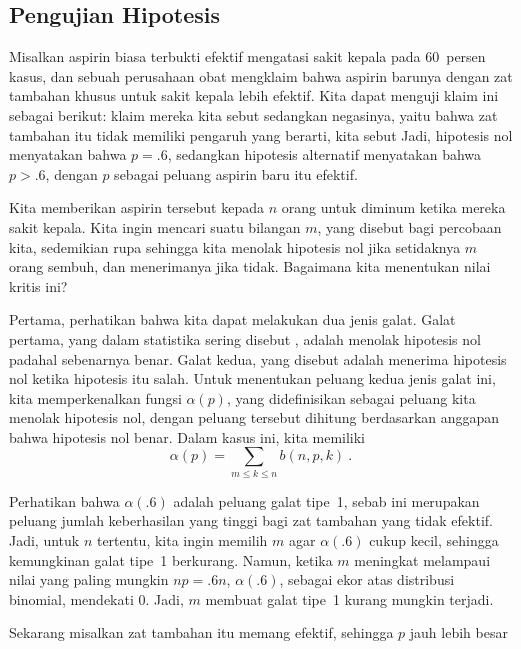 \subsection*{Pengujian Hipotesis}

\begin{example}\label{exam 3.12} Misalkan aspirin biasa terbukti efektif mengatasi sakit
kepala pada 60~persen kasus, dan sebuah perusahaan obat mengklaim bahwa aspirin barunya
dengan zat tambahan khusus untuk sakit kepala lebih efektif.  Kita dapat menguji klaim
ini sebagai berikut: klaim mereka kita sebut  sedangkan
negasinya, yaitu bahwa zat tambahan itu tidak memiliki pengaruh yang berarti, kita sebut
  Jadi, hipotesis nol menyatakan bahwa $p = .6$, sedangkan hipotesis
alternatif menyatakan bahwa $p > .6$, dengan $p$ sebagai peluang aspirin baru itu efektif.
\par Kita memberikan aspirin tersebut kepada $n$ orang untuk diminum ketika mereka sakit
kepala.  Kita ingin mencari suatu bilangan $m$, yang disebut  bagi
percobaan kita, sedemikian rupa sehingga kita menolak hipotesis nol jika setidaknya $m$
orang sembuh, dan menerimanya jika tidak.  Bagaimana kita menentukan nilai kritis ini?
\par Pertama, perhatikan bahwa kita dapat melakukan dua jenis galat.  Galat pertama,
yang dalam statistika sering disebut , adalah
menolak hipotesis nol padahal sebenarnya benar.  Galat kedua, yang disebut  adalah menerima hipotesis nol ketika hipotesis itu salah.
Untuk menentukan peluang kedua jenis galat ini, kita memperkenalkan fungsi $\alpha(p)$,
yang didefinisikan sebagai peluang kita menolak hipotesis nol, dengan peluang tersebut
dihitung berdasarkan anggapan bahwa hipotesis nol benar.  Dalam kasus ini, kita memiliki
$$\alpha(p)  =  \sum_{m \leq k \leq n} b(n,p,k)\ .$$
\par 
Perhatikan bahwa $\alpha(.6)$ adalah peluang galat tipe~1, sebab ini merupakan peluang
jumlah keberhasilan yang tinggi bagi zat tambahan yang tidak efektif.  Jadi, untuk $n$
tertentu, kita ingin memilih $m$ agar $\alpha(.6)$ cukup kecil, sehingga kemungkinan
galat tipe~1 berkurang.  Namun, ketika $m$ meningkat melampaui nilai yang paling mungkin
$np
= .6n$, $\alpha(.6)$, sebagai ekor atas distribusi binomial, mendekati 0.  Jadi,
 $m$ membuat galat tipe~1 kurang mungkin terjadi.
\par Sekarang misalkan zat tambahan itu memang efektif, sehingga $p$ jauh lebih besar

\end{example}
